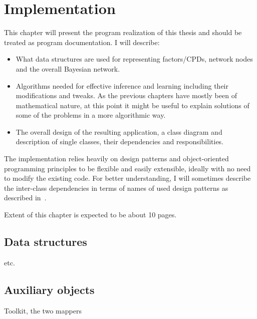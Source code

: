 \documentclass[english,cover]{fitthesis} %
\newcommand{\srccode}[1]{{\tt #1}}         %
\newcommand{\todo}[1]{{\color{red}#1}}
\begin{document}
\chapter{Implementation}
This chapter will present the program realization of this thesis and should be treated as program documentation. I will describe:
\begin{itemize}
	\item What data structures are used for representing factors/CPDs, network nodes and the overall Bayesian network.
	\item Algorithms needed for effective inference and learning including their modifications and tweaks. As the previous chapters have mostly been of mathematical nature, at this point it might be useful to explain solutions of some of the problems in a more algorithmic way.
	\item The overall design of the resulting application, a class diagram and description of single classes, their dependencies and responsibilities.
\end{itemize}
The implementation relies heavily on design patterns and object-oriented programming principles to be flexible and easily extensible, ideally with no need to modify the existing code. For better understanding, I will sometimes describe the inter-class dependencies in terms of names of used design patterns as described in~\cite{head_first_design_patterns}.

\todo{Extent of this chapter is expected to be about 10 pages.}



\section{Data structures}
\todo{\srccode{Variable, Factor, Node, BayesianNetwork} etc.}








\section{Auxiliary objects}
\todo{Toolkit, the two mappers}
\end{document}

